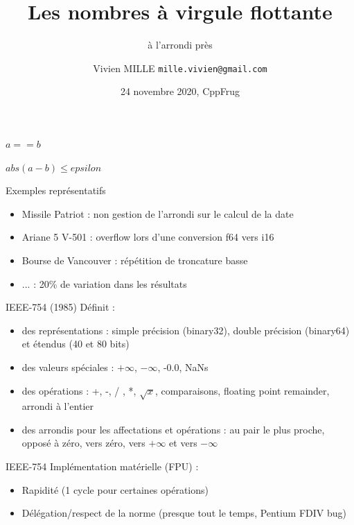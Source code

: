 \documentclass{beamer}
\title{Les nombres à virgule flottante}
\subtitle{à l'arrondi près}
\date{24 novembre 2020, CppFrug}
\author{Vivien MILLE \texttt{mille.vivien@gmail.com}}
\begin{document}
  \maketitle
  
\begin{frame}
\begin{Huge}
\begin{center}
$a == b$
\end{center}
\end{Huge}
\end{frame}  
  
\begin{frame}
\begin{Huge}
\begin{center}
$abs(a - b) \leq epsilon$
\end{center}
\end{Huge}
\end{frame}    

        \begin{frame}{Exemples représentatifs}
\begin{itemize}
\item Missile Patriot : non gestion de l'arrondi sur le calcul de la date
\item Ariane 5 V-501 : overflow lors d'une conversion f64 vers i16
\item Bourse de Vancouver : répétition de troncature basse 
\item ... : 20\% de variation dans les résultats
\end{itemize}
  \end{frame}
  
  
  \begin{frame}{IEEE-754 (1985)}
Définit :
    \begin{itemize}
      \item des représentations : simple précision (binary32), double précision (binary64) et étendus (40 et 80 bits)
      \item des valeurs spéciales : $+\infty$, $-\infty$, -0.0, NaNs
      \item des opérations : +, -, / , *, $\sqrt{x}$, comparaisons, floating point remainder, arrondi à l'entier
      \item des arrondis pour les affectations et opérations : au pair le plus proche, opposé à zéro, vers zéro, vers $+\infty$ et vers $-\infty$
    \end{itemize}
  \end{frame}
  
  \begin{frame}{IEEE-754}
    Implémentation matérielle (FPU) : 
    \begin{itemize}
      \item Rapidité (1 cycle pour certaines opérations)
      \item Délégation/respect de la norme (presque tout le temps, Pentium FDIV bug)
    \end{itemize}
  \end{frame}
  
\end{document}
